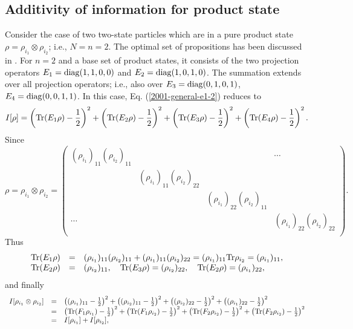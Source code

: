 \subsection{Additivity of information for product state}
Consider the case of two two-state
particles which are in a pure product state $\rho= \rho_{i_1}\otimes \rho_{i_2}$; i.e.,
$N=n=2$.
The optimal set of propositions has been discussed in
\cite{DonSvo01}.
For $n=2$ and a base set of product states, it consists of
the two projection operators
$E_1={\rm diag}(1,1,0,0)$
and
$E_2={\rm diag}(1,0,1,0)$.
The summation extends over all projection operators; i.e., also over
$E_3={\rm diag}(0,1,0,1)$,
$E_4={\rm diag}(0,0,1,1)$.
In this case,  Eq. (\ref{2001-general-e1-2}) reduces to
\begin{equation}
I[\rho ]=
\left( {\rm Tr} (E_1 \rho)-{1\over 2} \right)^2
+ \left( {\rm Tr} (E_2 \rho)-{1\over 2}\right)^2
+ \left( {\rm Tr} (E_3 \rho)-{1\over 2}\right)^2
+ \left( {\rm Tr} (E_4 \rho)-{1\over 2}\right)^2
.
\end{equation}
Since
\begin{equation}
\rho=  \rho_{i_1}\otimes \rho_{i_2} =
\left(
\begin{array}{cccc}
(\rho_{i_1})_{11} (\rho_{i_2})_{11}&&&\cdots \\
&(\rho_{i_1})_{11} (\rho_{i_2})_{22}& &\\
&&(\rho_{i_1})_{22} (\rho_{i_2})_{11} &\\
\cdots &&&(\rho_{i_1})_{22} (\rho_{i_2})_{22}\\
\end{array}
\right).
\label{2001-general-xxx}
\end{equation}
Thus
\begin{equation}
\begin{array}{llll}
{\rm Tr} (E_1\rho)&=&(\rho_{i_1})_{11}(\rho_{i_2})_{11}+(\rho_{i_1})_{11}(\rho_{i_2})_{22}=(\rho_{i_1})_{11}{\rm Tr} \rho_{i_2}=(\rho_{i_1})_{11},\\
{\rm Tr} (E_2\rho)&=&(\rho_{i_2})_{11},
\quad
{\rm Tr} (E_3\rho)=(\rho_{i_2})_{22},
\quad
{\rm Tr} (E_2\rho)=(\rho_{i_1})_{22},
\end{array}
\label{2001-general-xxx1}
\end{equation}
and finally
\begin{equation}
\begin{array}{llll}
I[\rho_{i_1} \otimes \rho_{i_2} ]
&=&
\left((\rho_{i_1})_{11}-{1\over 2}\right)^2+
\left((\rho_{i_2})_{11}-{1\over 2}\right)^2+
\left((\rho_{i_2})_{22}-{1\over 2}\right)^2+
\left((\rho_{i_1})_{22}-{1\over 2}\right)^2
\\
&=&
\left({\rm Tr} (F_1 \rho_{i_1})-{1\over 2}\right)^2+
\left({\rm Tr} (F_1 \rho_{i_2})-{1\over 2}\right)^2+
\left({\rm Tr} (F_2 \rho_{i_2})-{1\over 2}\right)^2+
\left({\rm Tr} (F_2 \rho_{i_2})-{1\over 2}\right)^2
\\
&=&I[\rho_{i_1}]+I[\rho_{i_2}],
\end{array}
\end{equation}
